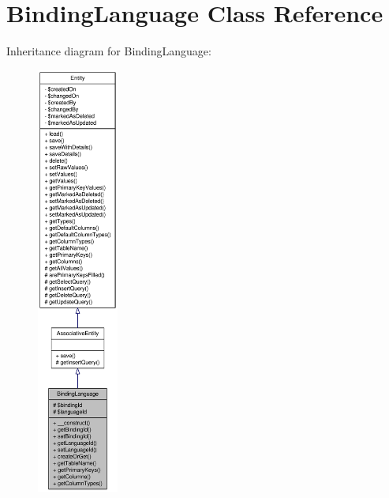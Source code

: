 \hypertarget{classBindingLanguage}{
\section{BindingLanguage Class Reference}
\label{classBindingLanguage}
}


Inheritance diagram for BindingLanguage:\nopagebreak
\begin{figure}[H]
\begin{center}
\leavevmode
\includegraphics[height=400pt]{classBindingLanguage__inherit__graph}
\end{center}
\end{figure}


